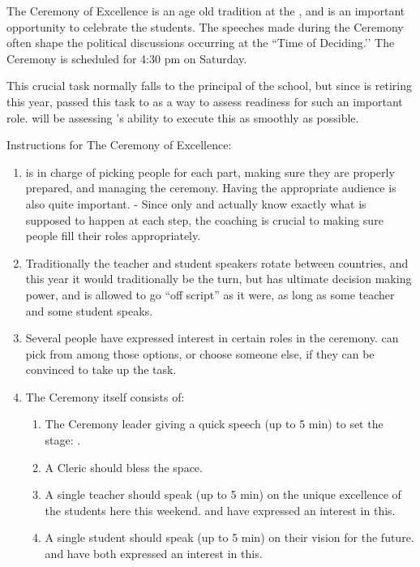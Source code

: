 \documentclass[green]{GL2020}
\begin{document}
\name{\gCeremonyOfExcellence{}}

The Ceremony of Excellence is an age old tradition at the \pSchool{}, and is an important opportunity to celebrate the students. The speeches made during the Ceremony often shape the political discussions occurring at the ``Time of Deciding.’’ The Ceremony is scheduled for 4:30 pm on Saturday.

This crucial task normally falls to the principal of the school, but since \cPrincipal{\full} is retiring this year, \cPrincipal{\they} \cPrincipal{\have} passed this task to \cMusic{\full} as a way to assess \cMusic{\their} readiness for such an important role. \cPrincipal{} will be assessing \cMusic{}’s ability to execute this as smoothly as possible.

Instructions for The Ceremony of Excellence:
\begin{enumerate}
  \item \cMusic{} is in charge of picking people for each part, making sure they are properly prepared, and managing the ceremony. Having the appropriate audience is also quite important. - Since only \cMusic{} and \cPrincipal{} actually know exactly what is supposed to happen at each step, the coaching is crucial to making sure people fill their roles appropriately.
  \item Traditionally the teacher and student speakers rotate between countries, and this year it would traditionally be the \pShippies{} turn, but \cMusic{} has ultimate decision making power, and is allowed to go ``off script'' as it were, as long as some teacher and some student speaks.
  \item Several people have expressed interest in certain roles in the ceremony. \cMusic{} can pick from among those options, or choose someone else, if they can be convinced to take up the task.
  \item The Ceremony itself consists of:
  \begin{enumerate}
    \item The Ceremony leader giving a quick speech (up to 5 min) to set the stage: \cMusic{}.
    \item A Cleric should bless the space.
    \item A single teacher should speak (up to 5 min) on the unique excellence of the students here this weekend. \cFlowPriest{\full} and \cPirate{\full} have expressed an interest in this.
    \item A single student should speak (up to 5 min) on their vision for the future. \cWarlordDaughter{\full} and \cPirateChild{\full} have both expressed an interest in this.

\end{enumerate}
\end{enumerate}
\end{document}
